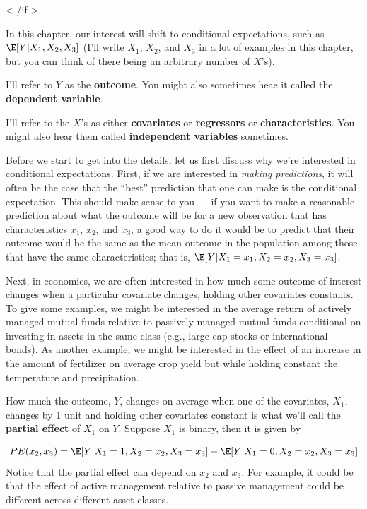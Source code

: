 \documentclass[
  letterpaper,
  DIV=11,
  numbers=noendperiod]{scrreprt}
\begin{document}
{{< /if  >}}

In this chapter, our interest will shift to conditional expectations,
such as \(\E[Y|X_1,X_2,X_3]\) (I'll write \(X_1\), \(X_2\), and \(X_3\)
in a lot of examples in this chapter, but you can think of there being
an arbitrary number of \(X\)'s).

I'll refer to \(Y\) as the \textbf{outcome}. You might also sometimes
heae it called the \textbf{dependent variable}.

I'll refer to the \(X\)'s as either \textbf{covariates} or
\textbf{regressors} or \textbf{characteristics}. You might also hear
them called \textbf{independent variables} sometimes.

Before we start to get into the details, let us first discuss why we're
interested in conditional expectations. First, if we are interested in
\emph{making predictions}, it will often be the case that the ``best''
prediction that one can make is the conditional expectation. This should
make sense to you --- if you want to make a reasonable prediction about
what the outcome will be for a new observation that has characteristics
\(x_1\), \(x_2\), and \(x_3\), a good way to do it would be to predict
that their outcome would be the same as the mean outcome in the
population among those that have the same characteristics; that is,
\(\E[Y|X_1=x_1, X_2=x_2, X_3=x_3]\).

Next, in economics, we are often interested in how much some outcome of
interest changes when a particular covariate changes, holding other
covariates constants. To give some examples, we might be interested in
the average return of actively managed mutual funds relative to
passively managed mutual funds conditional on investing in assets in the
same class (e.g., large cap stocks or international bonds). As another
example, we might be interested in the effect of an increase in the
amount of fertilizer on average crop yield but while holding constant
the temperature and precipitation.

How much the outcome, \(Y\), changes on average when one of the
covariates, \(X_1\), changes by 1 unit and holding other covariates
constant is what we'll call the \textbf{partial effect} of \(X_1\) on
\(Y\). Suppose \(X_1\) is binary, then it is given by

\[
  PE(x_2,x_3) = \E[Y | X_1=1, X_2=x_2, X_3=x_3] - \E[Y | X_1=0,X_2=x_2,X_3=x_3]
\] Notice that the partial effect can depend on \(x_2\) and \(x_3\). For
example, it could be that the effect of active management relative to
passive management could be different across different asset classes.
\end{document}
